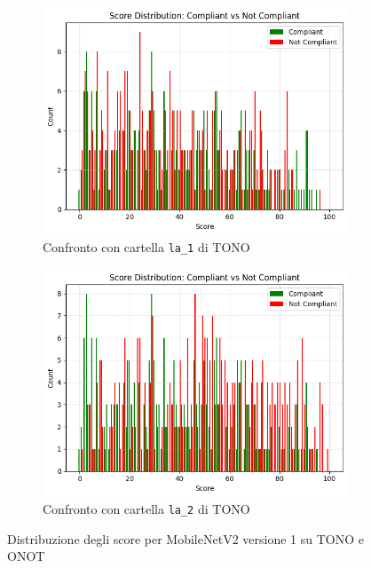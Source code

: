 \documentclass[12pt,a4paper,openright,twoside]{book}
\begin{document}
\begin{figure}[htbp]
    \centering
    \begin{subfigure}{0.49\textwidth}
        \centering
        \includegraphics[width=.7\linewidth]{figures/score-distribution-frontal-gaze-gdd-v1-la1.png}
        \caption{Confronto con cartella \texttt{la\_1} di TONO}
        \label{fig:score_distribution_frontal_gaze_gdd_v1_la1}
    \end{subfigure}
    \hfill
    \begin{subfigure}{0.49\textwidth}
        \centering
        \includegraphics[width=.7\linewidth]{figures/score-distribution-frontal-gaze-gdd-v1-la2.png}
        \caption{Confronto con cartella \texttt{la\_2} di TONO}
        \label{fig:score_distribution_frontal_gaze_gdd_v1_la2}
    \end{subfigure}
    \caption{Distribuzione degli score per MobileNetV2 versione 1 su TONO e ONOT}
\end{figure}
\end{document}
